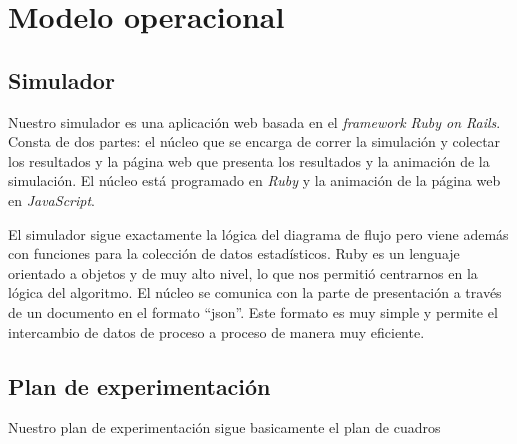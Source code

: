 \section{Modelo operacional}

\subsection{Simulador}

Nuestro simulador es una aplicación web basada en el \textit{framework} \emph{Ruby on Rails}.
Consta de dos partes: el núcleo que se encarga de correr la simulación y colectar los resultados
y la página web que presenta los resultados y la animación de la simulación.
El núcleo está programado en \emph{Ruby} y la animación de la página web en \emph{JavaScript}.


El simulador sigue exactamente la lógica del diagrama de flujo pero viene además con funciones
para la colección de datos estadísticos. Ruby es un lenguaje orientado a objetos y de muy alto
nivel, lo que nos permitió centrarnos en la lógica del algoritmo. El núcleo se comunica con la
parte de presentación a través de un documento en el formato ``json''. Este formato es muy
simple y permite el intercambio de datos de proceso a proceso de manera muy eficiente.



\subsection{Plan de experimentación}

Nuestro plan de experimentación sigue basicamente el plan de cuadros

